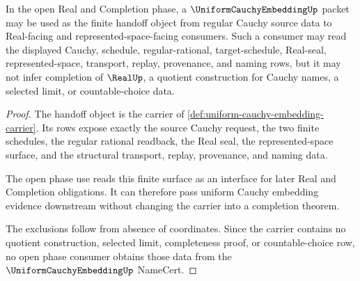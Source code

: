 \begin{theorem}
\label{thm:uniform-cauchy-embedding-open-phase-use}
In the open Real and Completion phase, a $\UniformCauchyEmbeddingUp$ packet may be used as the finite handoff object from regular Cauchy source data to Real-facing and represented-space-facing consumers. Such a consumer may read the displayed Cauchy, schedule, regular-rational, target-schedule, Real-seal, represented-space, transport, replay, provenance, and naming rows, but it may not infer completion of $\RealUp$, a quotient construction for Cauchy names, a selected limit, or countable-choice data.
\end{theorem}
\begin{proof}
The handoff object is the carrier of \autoref{def:uniform-cauchy-embedding-carrier}. Its rows expose exactly the source Cauchy request, the two finite schedules, the regular rational readback, the Real seal, the represented-space surface, and the structural transport, replay, provenance, and naming data.

The open phase use reads this finite surface as an interface for later Real and Completion obligations. It can therefore pass uniform Cauchy embedding evidence downstream without changing the carrier into a completion theorem.

The exclusions follow from absence of coordinates. Since the carrier contains no quotient construction, selected limit, completeness proof, or countable-choice row, no open phase consumer obtains those data from the $\UniformCauchyEmbeddingUp$ NameCert.
\end{proof}

\begin{closurestatus}{\UniformCauchyEmbeddingUp}
  \theoryclosure{\seedClosure}
  \formalstatus{\unformalizedV}
\end{closurestatus}

